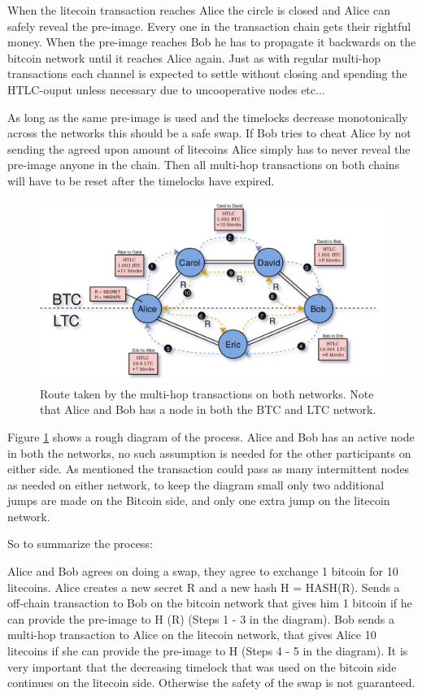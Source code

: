 When the litecoin transaction reaches Alice the circle is closed and Alice can safely reveal the pre-image. Every one in the transaction chain gets their rightful money. When the pre-image reaches Bob he has to propagate it backwards on the bitcoin network until it reaches Alice again. Just as with regular multi-hop transactions each channel is expected to settle without closing and spending the HTLC-ouput unless necessary due to uncooperative nodes etc... 

As long as the same pre-image is used and the timelocks decrease monotonically across the networks this should be a safe swap. If Bob tries to cheat Alice by not sending the agreed upon amount of litecoins Alice simply has to never reveal the pre-image anyone in the chain. Then all multi-hop transactions on both chains will have to be reset after the timelocks have expired.

\begin{figure}[H]
	\centering
	\includegraphics[width=1\textwidth]{background/images/ln_route_swap.png}
	\caption{Route taken by the multi-hop transactions on both networks. Note that Alice and Bob has a node in both the BTC and LTC network.}
	\label{fig:ln-swap}
\end{figure}

Figure \ref{fig:ln-swap} shows a rough diagram of the process. Alice and Bob has an active node in both the networks, no such assumption is needed for the other participants on either side. As mentioned the transaction could pass as many intermittent nodes as needed on either network, to keep the diagram small only two additional jumps are made on the Bitcoin side, and only one extra jump on the litecoin network.  

So to summarize the process: 

Alice and Bob agrees on doing a swap, they agree to exchange 1 bitcoin for 10 litecoins. Alice creates a new secret R and a new hash H = HASH(R). Sends a off-chain transaction to Bob on the bitcoin network that gives him 1 bitcoin if he can provide the pre-image to H (R) (Steps 1 - 3 in the diagram). Bob sends a multi-hop transaction to Alice on the litecoin network, that gives Alice 10 litecoins if she can provide the pre-image to H (Steps 4 - 5 in the diagram). It is very important that the decreasing timelock that was used on the bitcoin side continues on the litecoin side. Otherwise the safety of the swap is not guaranteed. 

